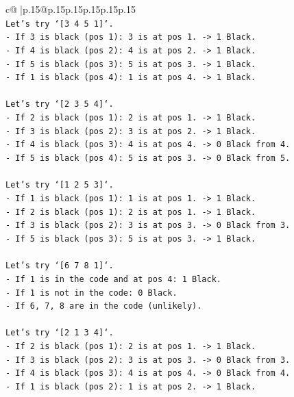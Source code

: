 \documentclass{article}
\begin{document}
{\begin{supertabular}{c@{$\;$}|p{.15\linewidth}@{}p{.15\linewidth}p{.15\linewidth}p{.15\linewidth}p{.15\linewidth}p{.15\linewidth}}
{{{\\ 
\texttt{Let's try `{[}3 4 5 1{]}`.} \\
\texttt{{-} If 3 is black (pos 1): 3 is at pos 1. {-}> 1 Black.} \\
\texttt{{-} If 4 is black (pos 2): 4 is at pos 2. {-}> 1 Black.} \\
\texttt{{-} If 5 is black (pos 3): 5 is at pos 3. {-}> 1 Black.} \\
\texttt{{-} If 1 is black (pos 4): 1 is at pos 4. {-}> 1 Black.} \\
\\ 
\texttt{Let's try `{[}2 3 5 4{]}`.} \\
\texttt{{-} If 2 is black (pos 1): 2 is at pos 1. {-}> 1 Black.} \\
\texttt{{-} If 3 is black (pos 2): 3 is at pos 2. {-}> 1 Black.} \\
\texttt{{-} If 4 is black (pos 3): 4 is at pos 4. {-}> 0 Black from 4.} \\
\texttt{{-} If 5 is black (pos 4): 5 is at pos 3. {-}> 0 Black from 5.} \\
\\ 
\texttt{Let's try `{[}1 2 5 3{]}`.} \\
\texttt{{-} If 1 is black (pos 1): 1 is at pos 1. {-}> 1 Black.} \\
\texttt{{-} If 2 is black (pos 1): 2 is at pos 1. {-}> 1 Black.} \\
\texttt{{-} If 3 is black (pos 2): 3 is at pos 3. {-}> 0 Black from 3.} \\
\texttt{{-} If 5 is black (pos 3): 5 is at pos 3. {-}> 1 Black.} \\
\\ 
\texttt{Let's try `{[}6 7 8 1{]}`.} \\
\texttt{{-} If 1 is in the code and at pos 4: 1 Black.} \\
\texttt{{-} If 1 is not in the code: 0 Black.} \\
\texttt{{-} If 6, 7, 8 are in the code (unlikely).} \\
\\ 
\texttt{Let's try `{[}2 1 3 4{]}`.} \\
\texttt{{-} If 2 is black (pos 1): 2 is at pos 1. {-}> 1 Black.} \\
\texttt{{-} If 3 is black (pos 2): 3 is at pos 3. {-}> 0 Black from 3.} \\
\texttt{{-} If 4 is black (pos 3): 4 is at pos 4. {-}> 0 Black from 4.} \\
\texttt{{-} If 1 is black (pos 2): 1 is at pos 2. {-}> 1 Black.} \\
}}}
\end{supertabular}}
\end{document}
